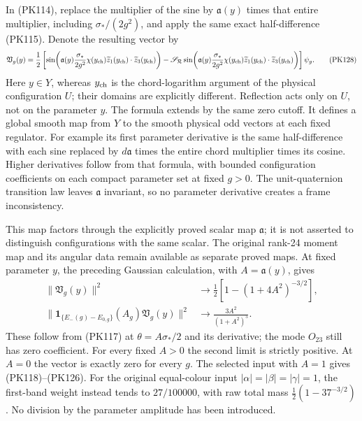 \documentclass[11pt]{article}
\begin{document}
In (PK114), replace the multiplier of the sine by
\(\mathfrak a(y)\) times that entire multiplier, including
\(\sigma_*/(2g^2)\), and apply the same exact half-difference (PK115).
Denote the resulting vector by
\[
 \mathfrak V_g(y)=
 \frac12\left[
  \sin\!\left(\mathfrak a(y)\frac{\sigma_*}{2g^2}
      \chi(y_{\rm ch})\widetilde z_1(y_{\rm ch})
                            \cdot\widetilde z_3(y_{\rm ch})\right)
  -\mathscr S_{\mathcal R}
  \sin\!\left(\mathfrak a(y)\frac{\sigma_*}{2g^2}
      \chi(y_{\rm ch})\widetilde z_1(y_{\rm ch})
                            \cdot\widetilde z_3(y_{\rm ch})\right)
 \right]\psi_g .
 \tag{PK128}
\]
Here \(y\in Y\), whereas \(y_{\rm ch}\) is the chord-logarithm
argument of the physical configuration \(U\); their domains are
explicitly different. Reflection acts only on \(U\), not on the
parameter \(y\). The formula extends by the same zero cutoff.
It defines a global smooth map from \(Y\) to the smooth physical odd
vectors at each fixed regulator. For example its first parameter
derivative is the same half-difference with each sine replaced by
\(d\mathfrak a\) times the entire chord multiplier times its cosine.
Higher derivatives follow from that formula, with bounded configuration
coefficients on each compact parameter set at fixed \(g>0\).
The unit-quaternion transition law leaves \(\mathfrak a\) invariant,
so no parameter derivative creates a frame inconsistency.

This map factors through the explicitly proved scalar map \(\mathfrak a\);
it is not asserted to distinguish configurations with the same scalar.
The original rank-24 moment map and its angular data remain available
as separate proved maps. At fixed parameter \(y\), the preceding
Gaussian calculation, with \(A=\mathfrak a(y)\), gives
\[
 \begin{split}
 \|\mathfrak V_g(y)\|^2
     &\longrightarrow \tfrac12[1-(1+4A^2)^{-3/2}],\\
 \|\mathbf1_{\{E_-(g)-E_{0,g}\}}(A_g)\mathfrak V_g(y)\|^2
     &\longrightarrow \frac{3A^2}{(1+A^2)^5}.
 \end{split}\tag{PK129}
\]
These follow from (PK117) at \(\theta=A\sigma_*/2\) and its
derivative; the mode \(O_{23}\) still has zero coefficient.
For every fixed \(A>0\) the second limit is strictly positive.
At \(A=0\) the vector is exactly zero for every \(g\).
The selected input with \(A=1\) gives (PK118)–(PK126).
For the original equal-colour input
\(|\alpha|=|\beta|=|\gamma|=1\), the first-band weight instead
tends to \(27/100000\), with raw total mass
\(\frac12(1-37^{-3/2})\). No division by the parameter amplitude
has been introduced.
\end{document}
